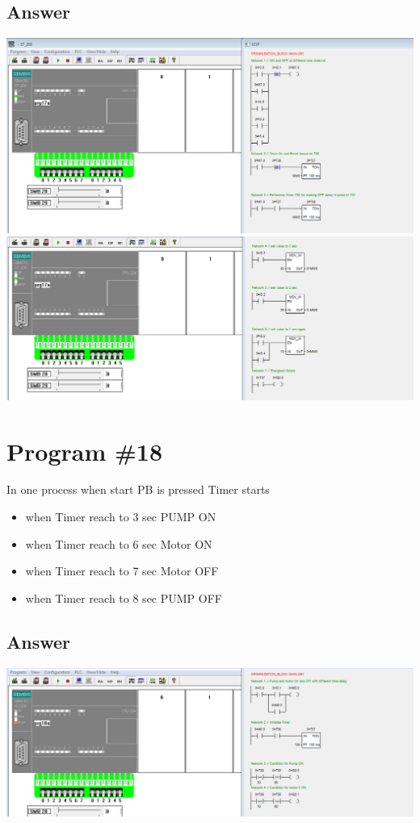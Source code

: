 \documentclass[
	12pt, %
]{fphw}
\begin{document}
  \subsection*{Answer}
  \begin{center}
   \includegraphics[width=165mm, scale=0.90]{p17a1.png}
   \includegraphics[width=165mm, scale=0.90]{p17a2.png}
 \end{center}

 \section*{Program \#18}
 \begin{problem}
  In one process when start PB is pressed Timer starts  \medskip
 \begin{itemize}
\item when Timer reach to 3 sec PUMP ON
\item when Timer reach to 6 sec Motor ON
\item when Timer reach to 7 sec Motor OFF
\item when Timer reach to 8 sec PUMP OFF
 \end{itemize}
\end{problem}
\subsection*{Answer}
\begin{center}
\includegraphics[width=165mm, scale =0.9]{p18a1.png}
\end{center}
\end{document}

